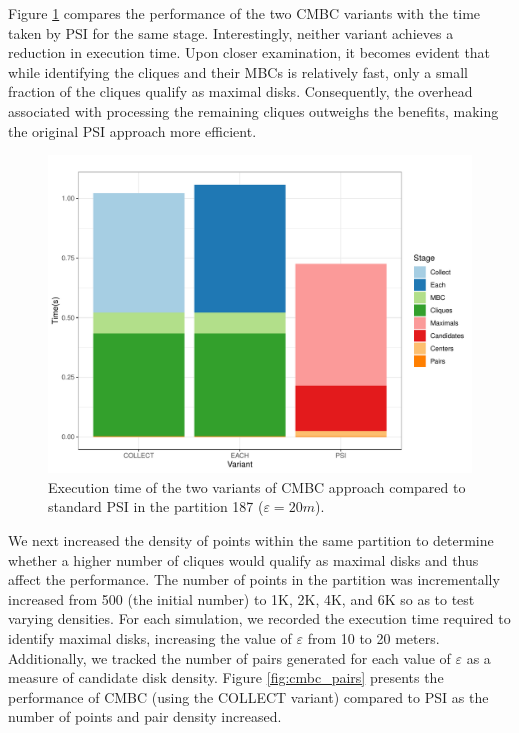 Figure \ref{fig:cmbc_500_psi} compares the performance of the two CMBC variants with the time taken by PSI for the same stage. Interestingly, neither variant achieves a reduction in execution time. Upon closer examination, it becomes evident that while identifying the cliques and their MBCs is relatively fast, only a small fraction of the cliques qualify as maximal disks. Consequently, the overhead associated with processing the remaining cliques outweighs the benefits, making the original PSI approach more efficient.

\begin{figure}
    \centering
    \includegraphics[width=0.75\linewidth] {chapterPFlocks/figures/plots/10_cmbc/cmbc_500_psi}
    \caption{Execution time of the two variants of CMBC approach compared to standard PSI in the partition 187 ($\varepsilon=20m$).}\label{fig:cmbc_500_psi}
\end{figure}

We next increased the density of points within the same partition to determine whether a higher number of cliques would qualify as maximal disks and thus affect the performance. 
The number of points in the partition was incrementally increased from 500 (the initial number) to 1K, 2K, 4K, and 6K so as to test varying densities. For each simulation, we recorded the execution time required to identify maximal disks, increasing the value of $\varepsilon$ from 10 to 20 meters. Additionally, we tracked the number of pairs generated for each value of $\varepsilon$ as a measure of candidate disk density. Figure \ref{fig:cmbc_pairs} presents the performance of CMBC (using the COLLECT variant) compared to PSI as the number of points and pair density increased.

